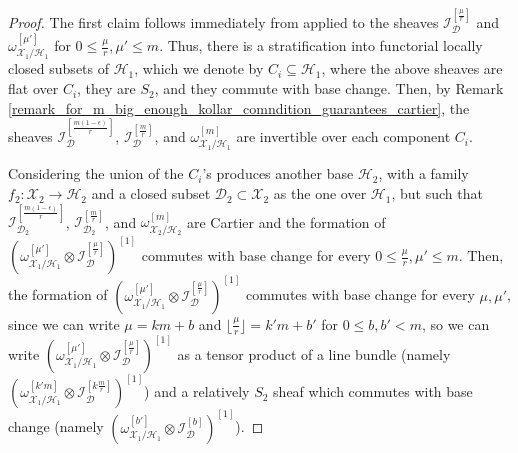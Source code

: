 \documentclass{amsart}
\newcommand{\sD}{\mathscr{D}}
\newcommand{\sH}{\mathscr{H}}
\newcommand{\sI}{\mathscr{I}}
\newcommand{\sX}{\mathscr{X}}
\theoremstyle{definition}
\begin{document}
\begin{proof}
The first claim follows immediately from \cites{kol08} applied to the sheaves $\sI_\sD^{[\frac{\mu}{r}]}$ and $\omega_{\sX_1/\sH_1}^{[\mu']}$ for $0 \leq \frac{\mu}{r}, \mu' \leq m$. Thus, there is a stratification into functorial locally closed subsets of $\sH_1$, which we denote by $C_i\subseteq \sH_1$, where the above sheaves are flat over $C_i$, they are $S_2$, and they commute with base change. Then, by Remark \ref{remark_for_m_big_enough_kollar_comndition_guarantees_cartier}, the sheaves $\sI_\sD^{[\frac{m(1-\epsilon)}{r}]}$, $\sI_\sD^{[\frac{m}{r}]}$,  and $\omega_{\sX_1/\sH_1}^{[m]}$ are invertible over each component $C_i$.

Considering the union of the $C_i$'s produces another base $\sH_2$, with a family $f_2 \colon \sX_2 \to \sH_2$ and a closed subset $\sD_2 \subset \sX_2$ as the one over $\sH_1$, but such that $\sI_{\sD_2}^{[\frac{m(1-\epsilon)}{r}]}$, $\sI_{\sD_2}^{[\frac{m}{r}]}$, and $\omega_{\sX_2/\sH_2}^{[m]}$ are Cartier and the formation of $(\omega_{\sX_1/\sH_1}^{[\mu']}\otimes\sI_\sD^{[\frac{\mu}{r}]})^{[1]}$ commutes with base change for every $0\leq \frac{\mu}{r}, \mu' \leq m$.
Then, the formation of
$(\omega_{\sX_1/\sH_1}^{[\mu']}\otimes\sI_\sD^{[\frac{\mu}{r}]})^{[1]}$ commutes with base change for every $\mu, \mu'$, since we can write $\mu=km+b$ and $\lfloor\frac{\mu}{r}\rfloor=k'm+b'$ for $0\le b, b' <m$, so we can write $(\omega_{\sX_1/\sH_1}^{[\mu']}\otimes\sI_\sD^{[\frac{\mu}{r}]})^{[1]}$ as a tensor product of a line bundle (namely $(\omega_{\sX_1/\sH_1}^{[k'm]}\otimes\sI_\sD^{[k\frac{m}{r}]})^{[1]}$) and a relatively $S_2$
sheaf which commutes with base change (namely $(\omega_{\sX_1/\sH_1}^{[b']}\otimes\sI_\sD^{[b]})^{[1]}$).






\end{proof}
\end{document}
